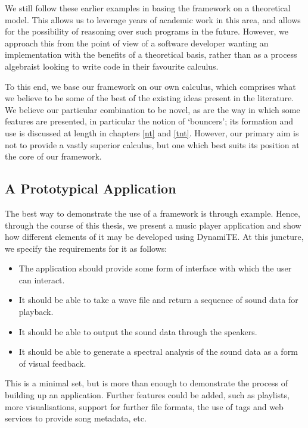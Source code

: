 We still follow these earlier examples in basing the framework on a
theoretical model.  This allows us to leverage years of academic work
in this area, and allows for the possibility of reasoning over such
programs in the future.  However, we approach this from the point of
view of a software developer wanting an implementation with the
benefits of a theoretical basis, rather than as a process algebraist
looking to write code in their favourite calculus.

To this end, we base our framework on our own calculus, which
comprises what we believe to be some of the best of the existing ideas
present in the literature.  We believe our particular combination to
be novel, as are the way in which some features are presented, in
particular the notion of `bouncers'; its formation and use is
discussed at length in chapters \ref{nt} and \ref{tnt}.  However, our
primary aim is not to provide a vastly superior calculus, but one
which best suits its position at the core of our framework.

\subsection{A Prototypical Application}
\label{app:req}

The best way to demonstrate the use of a framework is through example.
Hence, through the course of this thesis, we present a music player
application and show how different elements of it may be developed
using DynamiTE.  At this juncture, we specify the requirements for it
as follows:

\begin{itemize}
\item The application should provide some form of interface with which
  the user can interact.
\item It should be able to take a wave file and return a sequence of
  sound data for playback.
\item It should be able to output the sound data through the speakers.
\item It should be able to generate a spectral analysis of the sound
  data as a form of visual feedback.
\end{itemize}

This is a minimal set, but is more than enough to demonstrate the
process of building up an application.  Further features could be
added, such as playlists, more visualisations, support for further
file formats, the use of tags and web services to provide song
metadata, etc.

